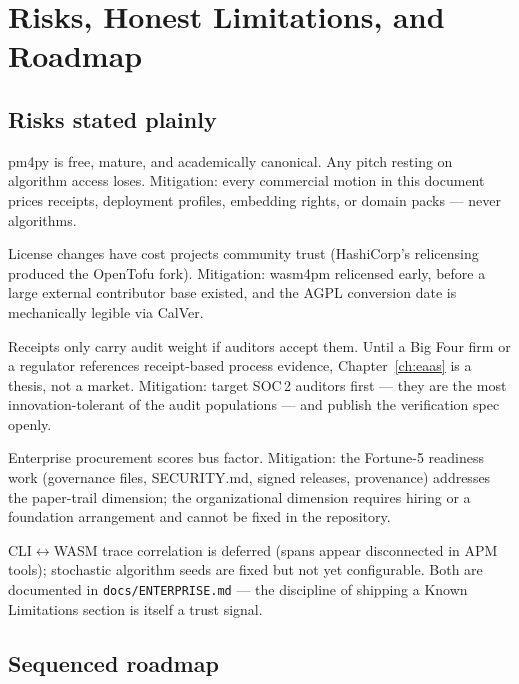 \chapter{Risks, Honest Limitations, and Roadmap}
\label{ch:risks}

\section{Risks stated plainly}

\begin{description}[leftmargin=2em]
  \item[Commodity algorithms.] pm4py is free, mature, and academically
    canonical. Any pitch resting on algorithm access loses. Mitigation:
    every commercial motion in this document prices receipts, deployment
    profiles, embedding rights, or domain packs --- never algorithms.
  \item[BUSL backlash.] License changes have cost projects community trust
    (HashiCorp's relicensing produced the OpenTofu fork). Mitigation:
    wasm4pm relicensed early, before a large external contributor base
    existed, and the AGPL conversion date is mechanically legible via
    CalVer.
  \item[Evidence without endorsement.] Receipts only carry audit weight if
    auditors accept them. Until a Big Four firm or a regulator references
    receipt-based process evidence, Chapter~\ref{ch:eaas} is a thesis, not
    a market. Mitigation: target SOC\,2 auditors first --- they are the
    most innovation-tolerant of the audit populations --- and publish the
    verification spec openly.
  \item[Single-maintainer concentration.] Enterprise procurement scores
    bus factor. Mitigation: the Fortune-5 readiness work (governance
    files, SECURITY.md, signed releases, provenance) addresses the
    paper-trail dimension; the organizational dimension requires hiring or
    a foundation arrangement and cannot be fixed in the repository.
  \item[Known technical gaps.] CLI$\leftrightarrow$WASM trace correlation
    is deferred (spans appear disconnected in APM tools); stochastic
    algorithm seeds are fixed but not yet configurable. Both are
    documented in \texttt{docs/ENTERPRISE.md} --- the discipline of
    shipping a Known Limitations section is itself a trust signal.
\end{description}

\section{Sequenced roadmap}

